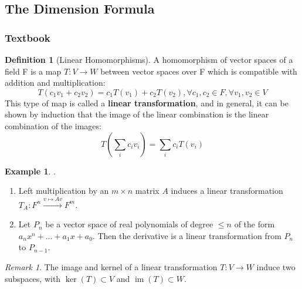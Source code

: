 \documentclass[12pt]{article}
\theoremstyle{definition}
\newtheorem{defn}[thm]{Definition}
\newtheorem{eg}[thm]{Example}
\theoremstyle{remark}
\newtheorem{rmk}[thm]{Remark}
\numberwithin{equation}{section}
\newcommand\B[1]{\textbf{ #1}}
\DeclareMathOperator{\im}{im}
\begin{document}
\subsection{The Dimension Formula}

\subsubsection{Textbook}

\begin{defn}[Linear Homomorphisms]
        A homomorphism of vector spaces of a field F is a map $T: V\rightarrow W$ between vector spaces over F which is compatible with addition and multiplication: \begin{equation}
                T(c_1v_1+c_2v_2) = c_1T(v_1)+c_2T(v_2), \forall c_1,c_2 \in F, \forall v_1,v_2\in V
        \end{equation}
        This type of map is called a \B{linear transformation}, and in general, it can be shown by induction that the image of the linear combination is the linear combination of the images: \begin{equation}
                T\left(\sum\limits_{i}c_iv_i\right) = \sum\limits_ic_iT(v_i)
        \end{equation}
\end{defn}

\vspace{15pt}

\begin{eg}
        .\newline \begin{enumerate}
                \item Left multiplication by an $m\times n$ matrix $A$ induces a linear transformation $T_A: F^n \xrightarrow{v\mapsto Av} F^m$.
                \item Let $P_n$ be a vector space of real polynomials of degree $\leq n$ of the form $a_nx^n+...+a_1x+a_0$. Then the derivative is a linear transformation from $P_n$ to $P_{n-1}$.
        \end{enumerate}
\end{eg}


\vspace{15pt}

\begin{rmk}
        The image and kernel of a linear transformation $T:V\rightarrow W$ induce two subspaces, with $\ker(T) \subset V$ and $\im(T) \subset W$.
\end{rmk}
\end{document}

